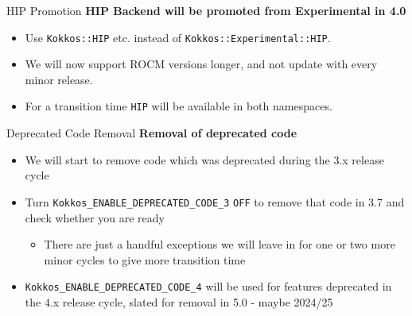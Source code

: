 \begin{frame}[fragile]{HIP Promotion}
\textbf{HIP Backend will be promoted from Experimental in 4.0}

\vspace{10pt}

\begin{itemize}
\item {Use \texttt{Kokkos::HIP} etc. instead of \texttt{Kokkos::Experimental::HIP}.}
\item {We will now support ROCM versions longer, and not update with every minor release.}
\item {For a transition time \texttt{HIP} will be available in both namespaces.}
\end{itemize}

\end{frame}


\begin{frame}[fragile]{Deprecated Code Removal}
\textbf{Removal of deprecated code}

\vspace{10pt}
\begin{itemize}
\item {We will start to remove code which was deprecated during the 3.x release cycle}
\item {Turn \texttt{Kokkos\_ENABLE\_DEPRECATED\_CODE\_3} \texttt{OFF} to remove that code in 3.7 and check whether you are ready}
\begin{itemize}
\item {There are just a handful exceptions we will leave in for one or two more minor cycles to give more transition time}
\end{itemize}
\item {\texttt{Kokkos\_ENABLE\_DEPRECATED\_CODE\_4} will be used for features deprecated in the 4.x release cycle, slated for removal in 5.0 - maybe 2024/25}
\end{itemize}


\end{frame}



